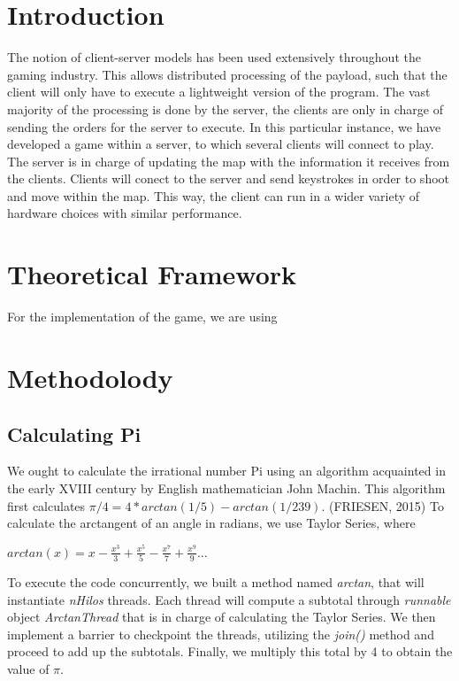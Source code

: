 \documentclass[10pt,a4paper]{article}
\theoremstyle{definition}
\begin{document}
\section{Introduction}
The notion of client-server models has been used extensively throughout the gaming industry. This allows distributed processing of the payload, such that the client will only have to execute a lightweight version of the program. 
The vast majority of the processing is done by the server, the clients are only in charge of sending the orders for the server to execute. 
In this particular instance, we have developed a game within a server, to which several clients will connect to play. 
The server is in charge of updating the map with the information it receives from the clients. 
Clients will conect to the server and send keystrokes in order to shoot and move within the map. 
This way, the client can run in a wider variety of hardware choices with similar performance.


\section{Theoretical Framework}
For the implementation of the game, we are using

\section{Methodolody}
\subsection{Calculating Pi}
We ought to calculate the irrational number Pi using an algorithm acquainted in the early XVIII century by English mathematician John Machin. This algorithm first calculates \(\pi/4 = 4 * arctan(1/5) - arctan(1/239)\). (FRIESEN, 2015)\cite{FRIESEN2015} To calculate the arctangent of an angle in radians, we use Taylor Series, where\\
\begin{center}\(arctan(x) = x - \frac{x^3}{3} + \frac{x^5}{5} - \frac{x^7}{7} + \frac{x^9}{9} ...\)\end{center}
To execute the code concurrently, we built a method named \emph{arctan}, that will instantiate \emph{nHilos} threads. Each thread will compute a subtotal through \emph{runnable} object \emph{ArctanThread} that is in charge of calculating the Taylor Series. We then implement a barrier to checkpoint the threads, utilizing the \emph{join()} method and proceed to add up the subtotals. Finally, we multiply this total by 4 to obtain the value of \(\pi\).
\end{document}
